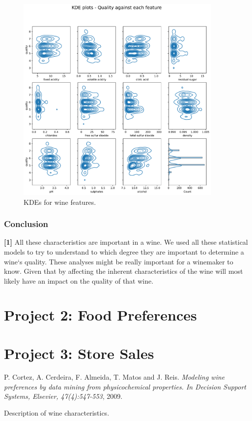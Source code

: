\documentclass[11pt]{article}
\begin{document}
\begin{figure}[h!]
    \includegraphics[width=0.9\textwidth]{figs/wine_kde}
    \caption{KDEs for wine features.}
    \label{fig:wine_kdes}
\end{figure}


\section*{Conclusion}

{\color{red}\textbf{[1]}} All these characteristics are important in a wine.
We used all these statistical models to try to understand to which degree they are important
to determine a wine`s quality.
These analyses might be really important for a winemaker to know.
Given that by affecting the inherent characteristics of the wine will most likely have an
impact on the quality of that wine.

\newpage
\part[food]{Project 2: Food Preferences} \label{part:food}


\newpage
\part[stores]{Project 3: Store Sales} \label{part:sales}



\begin{thebibliography}{1}
 P. Cortez, A. Cerdeira, F. Almeida, T. Matos and J. Reis. {\em Modeling wine preferences by data mining from physicochemical properties.
In Decision Support Systems, Elsevier, 47(4):547-553},  2009.
\end{thebibliography}




\begin{table}
    \centering
    \caption{Description of wine characteristics.}
    \resizebox{\columnwidth}{!}{
    
    }
    \label{tab:description_wine}
\end{table}
\end{document}
